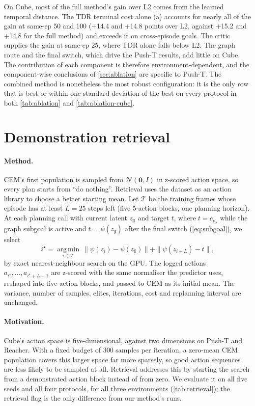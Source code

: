 \documentclass{article} %
\newcommand{\z}{z}
\newcommand{\psiT}{\psi}
\begin{document}
On Cube, most of the full method's gain over L2 comes from the learned temporal distance. The
TDR terminal cost alone (a) accounts for nearly all of the gain at same-ep 50 and 100 (+14.4 and
+14.8 points over L2, against +15.2 and +14.8 for the full method) and exceeds it on
cross-episode goals. The critic supplies the gain at same-ep 25, where TDR alone falls below L2.
The graph route and the final switch, which drive the Push-T results, add little on Cube. The
contribution of each component is therefore environment-dependent, and the component-wise
conclusions of \cref{sec:ablation} are specific to Push-T. The combined method is nonetheless
the most robust configuration: it is the only row that is best or within one standard deviation
of the best on every protocol in both \cref{tab:ablation} and \cref{tab:ablation-cube}.

\section{Demonstration retrieval}
\label{app:retrieval}

\paragraph{Method.} CEM's first population is sampled from $\mathcal{N}(\mathbf{0}, I)$ in
z-scored action space, so every plan starts from ``do nothing''. Retrieval uses the dataset as an
action library to choose a better starting mean. Let $\mathcal{T}$ be the training frames whose
episode has at least $L=25$ steps left (five 5-action blocks, one planning horizon). At each
planning call with current latent $\z_0$ and target $t$, where $t=c_{v_\lambda}$ while the graph
subgoal is active and $t=\psiT(\z_g)$ after the final switch (\cref{eq:subgoal}), we select
\begin{equation}
  i^\star=\operatorname*{arg\,min}_{i\in\mathcal{T}}\ \|\psiT(\z_i)-\psiT(\z_0)\|+\|\psiT(\z_{i+L})-t\|,
  \label{eq:retrieval}
\end{equation}
by exact nearest-neighbour search on the GPU. The logged actions $a_{i^\star},\dots,a_{i^\star+L-1}$
are z-scored with the same normaliser the predictor uses, reshaped into five action blocks, and
passed to CEM as its initial mean. The variance, number of samples, elites, iterations, cost
and replanning interval are unchanged. 
\paragraph{Motivation.} Cube's action space is five-dimensional, against two dimensions on
Push-T and Reacher. With a fixed budget of 300 samples per iteration, a zero-mean CEM population
covers this larger space far more sparsely, so good action sequences are less likely to be
sampled at all. Retrieval addresses this by starting the search from a demonstrated action
block instead of from zero. We evaluate it on all five seeds and all four protocols, for all
three environments (\cref{tab:retrieval}); the retrieval flag is the only difference from our
method's runs.
\end{document}
